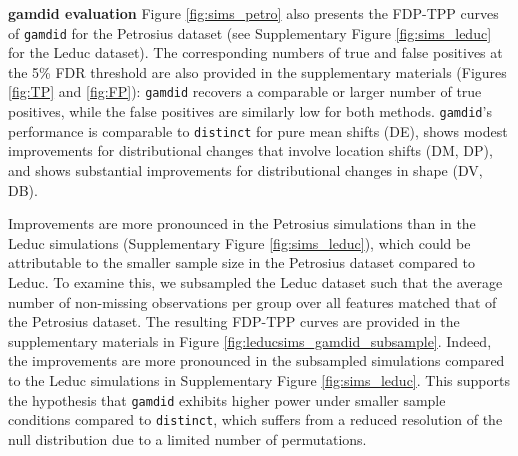 \textbf{gamdid evaluation}
Figure \ref{fig:sims_petro} also presents the FDP-TPP curves of \texttt{gamdid} for the Petrosius dataset (see Supplementary Figure \ref{fig:sims_leduc} for the Leduc dataset). The corresponding numbers of true and false positives at the 5\% FDR threshold are also provided in the supplementary materials (Figures \ref{fig:TP} and \ref{fig:FP}): \texttt{gamdid} recovers a comparable or larger number of true positives, while the false positives are similarly low for both methods.
\texttt{gamdid}'s performance is comparable to \texttt{distinct} for pure mean shifts (DE), shows modest improvements for distributional changes that involve location shifts (DM, DP), and shows substantial improvements for distributional changes in shape (DV, DB).

Improvements are more pronounced in the Petrosius simulations than in the Leduc simulations (Supplementary Figure \ref{fig:sims_leduc}), which could be attributable to the smaller sample size in the Petrosius dataset compared to Leduc.
To examine this, we subsampled the Leduc dataset such that the average number of non-missing observations per group over all features matched that of the Petrosius dataset. The resulting FDP-TPP curves are provided in the supplementary materials in Figure \ref{fig:leducsims_gamdid_subsample}. Indeed, the improvements are more pronounced in the subsampled simulations compared to the Leduc simulations in Supplementary Figure \ref{fig:sims_leduc}. This supports the hypothesis that \texttt{gamdid} exhibits higher power under smaller sample conditions compared to \texttt{distinct}, which suffers from a reduced resolution of the null distribution due to a limited number of permutations.





